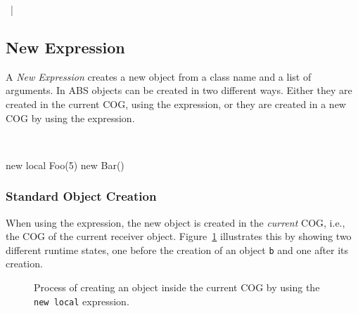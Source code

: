 \begin{abssyntax}
     {}
         ~|~ \\
  {}
           {}
           {}
           {}
\end{abssyntax}

\subsection{New Expression}
A \emph{New Expression} creates a new object from a class name and a list of arguments. In ABS objects can be created in two different ways.
Either they are created in the current COG, using the  expression,
or they are created in a new COG by using the  expression.

\begin{abssyntax}
  {}\ \ \ \TRS{(}  \TRS{)}  
\end{abssyntax}

\begin{absexample}
new local Foo(5)
new Bar()
\end{absexample}

\subsubsection{Standard Object Creation}
When using the  expression, the new object is created in the \emph{current} COG, i.e., the COG of the current receiver object.
Figure~\ref{fig:newExpr} illustrates this by showing two different runtime states, one before the creation of an object \verb_b_ and one after its creation.

\begin{figure}
\centering
{}
\caption{Process of creating an object inside the current COG by using the \texttt{new local} expression.}
\label{fig:newExpr}
\end{figure}

